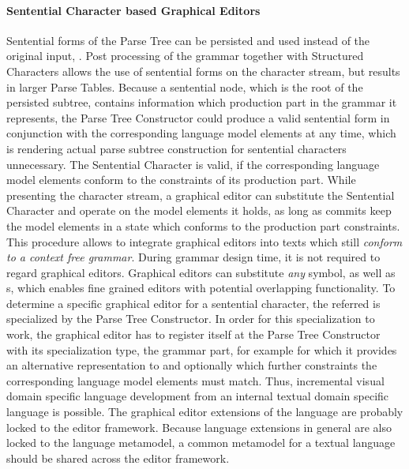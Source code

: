 \paragraph{Sentential Character based Graphical Editors}
Sentential forms of the Parse Tree can be persisted and used instead of the original input, \cite{iSW}. Post processing of the grammar together with Structured Characters allows the use of sentential forms on the character stream, but results in larger Parse Tables. Because a sentential node, which is the root of the persisted subtree, contains information which production part in the grammar it represents, the Parse Tree Constructor could produce a valid sentential form in conjunction with the corresponding language model elements at any time, which is rendering actual parse subtree construction for sentential characters unnecessary. The Sentential Character is valid, if the corresponding language model elements conform to the constraints of its production part. While presenting the character stream, a graphical editor can substitute the Sentential Character and operate on the model elements it holds, as long as commits keep the model elements in a state which conforms to the production part constraints. This procedure allows to integrate graphical editors into texts which still \emph{conform to a context free grammar}. During grammar design time, it is not required to regard graphical editors. Graphical editors can substitute \emph{any} symbol, as well as s, which enables fine grained editors with potential overlapping functionality. To determine a specific graphical editor for a sentential character, the referred  is specialized by the Parse Tree Constructor. In order for this specialization to work, the graphical editor has to register itself at the Parse Tree Constructor with its specialization type, the grammar part, for example for which  it provides an alternative representation to and optionally which further constraints the corresponding language model elements must match. Thus, incremental visual domain specific language development from an internal textual domain specific language is possible. The graphical editor extensions of the language are probably locked to the editor framework. Because language extensions in general are also locked to the language metamodel, a common metamodel for a textual language should be shared across the editor framework.


